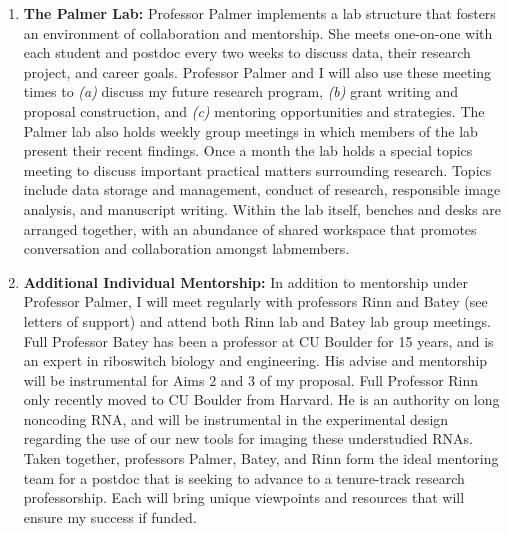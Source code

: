 \begin{enumerate}
  \item \textbf{The Palmer Lab:} Professor Palmer implements a lab structure that fosters an environment of collaboration and mentorship. She meets one-on-one with each student and postdoc every two weeks to discuss data, their research project, and career goals. Professor Palmer and I will also use these meeting times to \textit{(a)} discuss my future research program, \textit{(b)} grant writing and proposal construction, and \textit{(c)} mentoring opportunities and strategies.
  The Palmer lab also holds weekly group meetings in which members of the lab present their recent findings. Once a month the lab holds a special topics meeting to discuss important practical matters surrounding research. Topics include data storage and management, conduct of research, responsible image analysis, and manuscript writing.
  Within the lab itself, benches and desks are arranged together, with an abundance of shared workspace that promotes conversation and collaboration amongst labmembers.

  \item \textbf{Additional Individual Mentorship:} In addition to mentorship under Professor Palmer, I will meet regularly with professors Rinn and Batey (see letters of support) and attend both Rinn lab and Batey lab group meetings. Full Professor Batey has been a professor at CU Boulder for 15 years, and is an expert in riboswitch biology and engineering. His advise and mentorship will be instrumental for Aims 2 and 3 of my proposal. Full Professor Rinn only recently moved to CU Boulder from Harvard. He is an authority on long noncoding RNA, and will be instrumental in the experimental design regarding the use of our new tools for imaging these understudied RNAs. Taken together, professors Palmer, Batey, and Rinn form the ideal mentoring team for a postdoc that is seeking to advance to a tenure-track research professorship. Each will bring unique viewpoints and resources that will ensure my success if funded.

\end{enumerate}

